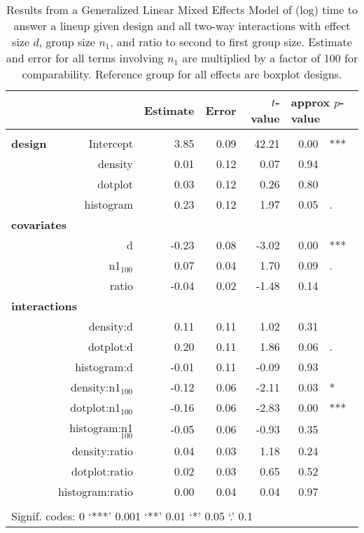 \begin{table}[ht]
\begin{center}
\resizebox{\linewidth}{!} {
\begin{tabular}{lrrrrrl}
  \hline
& & Estimate & Error & $t$-value & \multicolumn{2}{l}{approx $p$-value} \\   \hline
\\[-8pt]
\bf design& Intercept & 3.85 & 0.09 & 42.21 & 0.00 & ***\\ 
&  density & 0.01 & 0.12 & 0.07 & 0.94 \\ 
&  dotplot & 0.03 & 0.12 & 0.26 & 0.80 \\ 
&  histogram & 0.23 & 0.12 & 1.97 & 0.05 & . \\ [2pt]
\multicolumn{2}{l}{\bf covariates}\\
&      d & -0.23 & 0.08 & -3.02 & 0.00 & ***\\ [1pt]
&    n1$_{100}$ & 0.07 & 0.04 & 1.70 & 0.09 & .\\ [1pt]
&  ratio & -0.04 & 0.02 & -1.48 & 0.14  \\ [2pt]
\multicolumn{2}{l}{\bf interactions}\\
&  density:d & 0.11 & 0.11 & 1.02 & 0.31 \\ 
&  dotplot:d & 0.20 & 0.11 & 1.86 & 0.06 & .  \\ 
&  histogram:d & -0.01 & 0.11 & -0.09 & 0.93 \\ [1pt]
&  density:n1$_{100}$ & -0.12 & 0.06 & -2.11 & 0.03 & *\\ 
&  dotplot:n1$_{100}$ & -0.16 & 0.06 & -2.83 & 0.00 & ***\\ 
&  histogram:n1$_{100}$ & -0.05 & 0.06 & -0.93 & 0.35 \\ [1pt]
&  density:ratio & 0.04 & 0.03 & 1.18 & 0.24 \\ 
&  dotplot:ratio & 0.02 & 0.03 & 0.65 & 0.52 \\ 
&  histogram:ratio & 0.00 & 0.04 & 0.04 & 0.97 \\ 
   \hline
\\[-5pt]
   \multicolumn{5}{l}{Signif. codes:  0 `***' 0.001 `**' 0.01 `*' 0.05 `.' 0.1}
\end{tabular}}
\end{center}
\caption{\label{tbl:speed2}Results from a Generalized Linear Mixed Effects Model of (log) time to answer a lineup given design and all two-way interactions with effect size $d$, group size $n_1$, and ratio to second to first group size. Estimate and error for all terms involving $n_1$ are multiplied by a factor of 100 for comparability.
Reference group for all effects are boxplot designs. }
\end{table}

